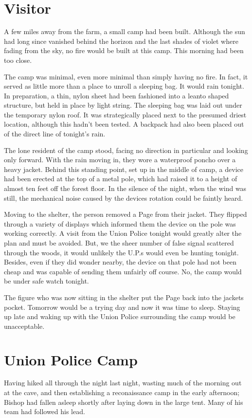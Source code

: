 \documentclass[courier]{sffms}
\begin{document}
\chapter{Visitor}
A few miles away from the farm, a small camp had been
built. Although the sun had long since vanished behind the horizon
and the last shades of violet where fading from the sky,
no fire would be built at this camp. This morning had been
too close.

The camp was minimal, even more minimal than simply
having no fire. In fact, it served as little more than a
place to unroll a sleeping bag. It would rain tonight.
In preparation, a thin, nylon sheet had been fashioned
into a leanto shaped structure, but held in place by light
string. The sleeping bag was laid out under the
temporary nylon roof. It was strategically placed next to
the presumed driest location, although this hadn't been
tested. A backpack had also been placed out of the
direct line of tonight's rain.

The lone resident of the camp stood, facing no direction
in particular and looking only forward. With the rain
moving in, they wore a waterproof poncho over a heavy
jacket. Behind this standing point, set up in the middle
of camp, a device had been erected at the top of a
metal pole, which had raised it to a height of almost ten
feet off the forest floor. In the silence of the night, when
the wind was still, the mechanical noise caused by
the devices rotation
could be faintly heard.

Moving to the shelter, the person removed a Page from
their jacket. They flipped through a variety of displays
which informed them the device on the pole was working
correctly. A visit from the Union Police tonight would
greatly alter the plan and must be avoided. But, we the
sheer number of false signal scattered through the woods,
it would unlikely the U.P.s would even be hunting tonight.
Besides, even if they did wonder nearby, the device on that
pole had not been cheap and was capable of sending them
unfairly off course. No, the camp would be under safe
watch tonight.

The figure who was now sitting in the shelter put the Page
back into the jackets pocket. Tomorrow would be
a trying day and now it was time to sleep. Staying up
late and waking up with the Union Police surrounding
the camp would be unacceptable.

\chapter{Union Police Camp}
Having hiked all through the night last night, wasting
much of the morning out at the cave, and then
establishing a reconaissance camp in the early afternoon;
Bishop had fallen asleep shortly after laying down in the
large tent. Many of his team had followed his lead.
\end{document}

